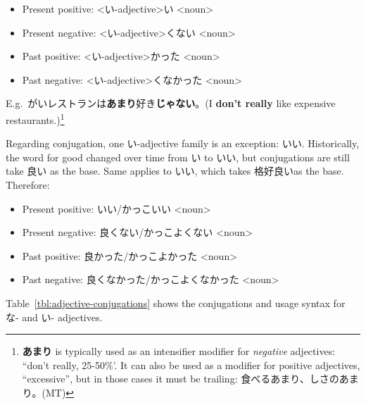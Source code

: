 \documentclass[../nihongo-gakushuu-kyouzai.tex]{subfiles}
\begin{document}
\begin{itemize}
    \begin{itemize}
        \item Present positive: <い-adjective>い <noun>
        \item Present negative: <い-adjective>くない <noun>
        \item Past positive: <い-adjective>かった <noun>
        \item Past negative: <い-adjective>くなかった <noun>
    \end{itemize}

    E.g.\ がいレストランは\textbf{あまり}好き\textbf{じゃない}。(I \textbf{don't really} like expensive restaurants.)\footnote{\textbf{あまり} is typically used as an intensifier modifier for \emph{negative} adjectives: ``don't really, 25-50\%'. It can also be used as a modifier for positive adjectives, ``excessive'', but in those cases it must be trailing: 食べるあまり、しさのあまり。(MT)}

    Regarding conjugation, one い-adjective family is an exception: いい. Historically, the word for good changed over time from い to いい, but conjugations are still take 良い as the base. Same applies to いい, which takes 格好良いas the base. Therefore:
    \begin{itemize}
        \item Present positive: いい/かっこいい <noun>
        \item Present negative: 良くない/かっこよくない <noun>
        \item Past positive: 良かった/かっこよかった <noun>
        \item Past negative: 良くなかった/かっこよくなかった <noun>
    \end{itemize}
\end{itemize}

Table~\ref{tbl:adjective-conjugations} shows the conjugations and usage syntax for な- and い- adjectives.
\end{document}
